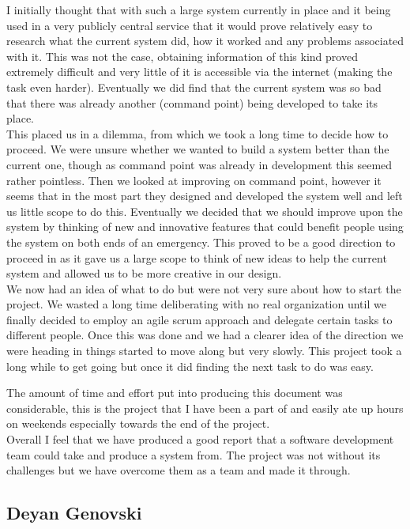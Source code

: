 \documentclass[]{article}
\begin{document}
I initially thought that with such a large system currently in place and it being used in a very publicly central service that it would prove relatively easy to research what the current system did, how it worked and any problems associated with it. This was not the case, obtaining information of this kind proved extremely difficult and very little of it is accessible via the internet (making the task even harder). Eventually we did find that the current system was so bad that there was already another (command point) being developed to take its place.\\

This placed us in a dilemma, from which we took a long time to decide how to proceed. We were unsure whether we wanted to build a system better than the current one, though as command point was already in development this seemed rather pointless. Then we looked at improving on command point, however it seems that in the most part they designed and developed the system well and left us little scope to do this. Eventually we decided that we should improve upon the system by thinking of new and innovative features that could benefit people using the system on both ends of an emergency. This proved to be a good direction to proceed in as it gave us a large scope to think of new ideas to help the current system and allowed us to be more creative in our design.\\

We now had an idea of what to do but were not very sure about how to start the project. We wasted a long time deliberating with no real organization until we finally decided to employ an agile scrum approach and delegate certain tasks to different people. Once this was done and we had a clearer idea of the direction we were heading in things started to move along but very slowly. This project took a long while to get going but once it did finding the next task to do was easy.\

The amount of time and effort put into producing this document was considerable, this is the project that I have been a part of and easily ate up hours on weekends especially towards the end of the project.\\

Overall I feel that we have produced a good report that a software development team could take and produce a system from. The project was not without its challenges but we have overcome them as a team and made it through.

    \pagebreak
    \subsection{Deyan Genovski}
    \pagebreak
\end{document}
